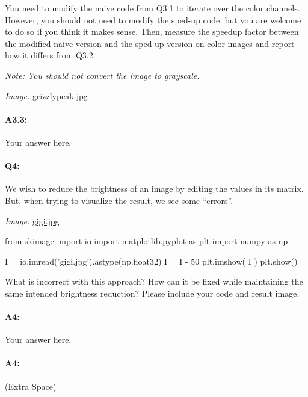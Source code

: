 \documentclass[11pt]{article}
\begin{document}
You need to modify the naive code from Q3.1 to iterate over the color channels. However, you should not need to modify the sped-up code, but you are welcome to do so if you think it makes sense. Then, measure the speedup factor between the modified naive version and the sped-up version on color images and report how it differs from Q3.2.

\emph{Note: You should not convert the image to grayscale.}

\emph{Image:} \href{grizzlypeak.jpg}{grizzlypeak.jpg}

\paragraph{A3.3:} Your answer here.




\pagebreak
\paragraph{Q4:} We wish to reduce the brightness of an image by editing the values in its matrix. But, when trying to visualize the result, we see some ``errors''.

\emph{Image:} \href{gigi.jpg}{gigi.jpg}

\begin{python}
from skimage import io
import matplotlib.pyplot as plt
import numpy as np

I =  io.imread('gigi.jpg').astype(np.float32)
I = I - 50
plt.imshow( I )
plt.show()
\end{python}

What is incorrect with this approach? How can it be fixed while maintaining the same intended brightness reduction? Please include your code and result image.

\paragraph{A4:} Your answer here.

\pagebreak
\paragraph{A4:} (Extra Space)
\end{document}

